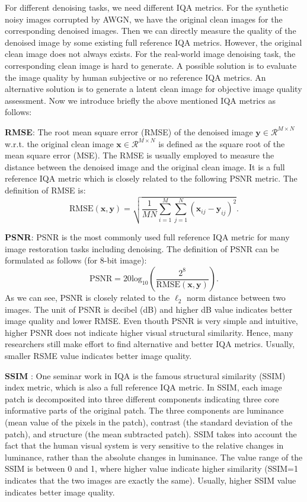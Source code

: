 For different denoising tasks, we need different IQA metrics. For the synthetic noisy images corrupted by AWGN, we have the original clean images for the corresponding denoised images. Then we can directly measure the quality of the denoised image by some existing full reference IQA metrics. However, the original clean image does not always exists. For the real-world image denoising task, the corresponding clean image is hard to generate. A possible solution is to evaluate the image quality by human subjective or no reference IQA metrics. An alternative solution is to generate a latent clean image for objective image quality assessment. Now we introduce briefly the above mentioned IQA metrics as follows:

\textbf{RMSE}: The root mean square error (RMSE) of the denoised image $\bm{y}\in\mathcal{R}^{M\times N}$ w.r.t. the original clean image $\bm{x}\in\mathcal{R}^{M\times N}$ is defined as the square root of the mean square error (MSE). The RMSE is usually employed to measure the distance between the denoised image and the original clean image. It is a full reference IQA metric which is closely related to the following PSNR metric. The definition of RMSE is:
\begin{equation}
\label{e13}
\text{RMSE}(\bm{x},\bm{y})
=
\sqrt{\frac{1}{MN}\sum_{i=1}^{M}\sum_{j=1}^{N}(\bm{x}_{ij}-\bm{y}_{ij})^{2}}.
\end{equation}



\textbf{PSNR}: PSNR is the most commonly used full reference IQA metric for many image restoration tasks including denoising. The definition of PSNR can be formulated as follows (for 8-bit image):
\begin{equation}
\label{e14}
\text{PSNR}
=
20\text{log}_{10}
(\frac{2^{8}}{\text{RMSE}(\bm{x},\bm{y})}).
\end{equation}
As we can see, PSNR is closely related to the $\ell_{2}$ norm distance between two images. The unit of PSNR is decibel (dB) and higher dB value indicates better image quality and lower RMSE. Even thouth PSNR is very simple and intuitive, higher PSNR does not indicate higher visual structural similarity. Hence, many researchers still make effort to find alternative and better IQA metrics. Usually, smaller RSME value indicates better image quality. 

\textbf{SSIM} \cite{ssim}: One seminar work in IQA is the famous structural similarity (SSIM) index metric, which is also a full reference IQA metric. In SSIM, each image patch is decomposited into three different components indicating three core informative parts of the original patch. The three components are luminance (mean value of the pixels in the patch), contrast (the standard deviation of the patch), and structure (the mean subtracted patch). SSIM takes into account the fact that the human visual system is very sensitive to the relative changes in luminance, rather than the absolute changes in luminance. The value range of the SSIM is between 0 and 1, where higher value indicate higher similarity (SSIM=1 indicates that the two images are exactly the same). Usually, higher SSIM value indicates better image quality. 

